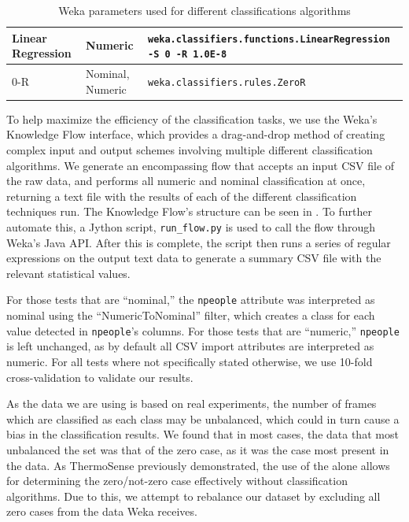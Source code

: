 \documentclass[../thesis/thesis.tex]{subfiles}
\begin{document}
\begin{table}[h]
\begin{tabular}{|p{40mm}|p{20mm}|p{70mm}|}
Linear Regression & Numeric & \texttt{weka.classifiers.functions\newline.LinearRegression \newline -S 0 -R 1.0E-8} \\ \hline

0-R & Nominal, \newline Numeric & \texttt{weka.classifiers.rules.ZeroR} \\ \hline
\end{tabular}
\caption{Weka parameters used for different classifications algorithms}
\label{tab:methods:params}
\end{table}

To help maximize the efficiency of the classification tasks, we use the Weka's Knowledge Flow interface, which provides a drag-and-drop method of creating complex input and output schemes involving multiple different classification algorithms. We generate an encompassing flow that accepts an input CSV file of the raw data, and performs all numeric and nominal classification at once, returning a text file with the results of each of the different classification techniques run. The Knowledge Flow's structure can be seen in . To further automate this, a Jython script, \texttt{run\_flow.py} is used to call the flow through Weka's Java API. After this is complete, the script then runs a series of regular expressions on the output text data to generate a summary CSV file with the relevant statistical values.

For those tests that are ``nominal,'' the \texttt{npeople} attribute was interpreted as nominal using the ``NumericToNominal'' filter, which creates a class for each value detected in \texttt{npeople}'s columns. For those tests that are ``numeric,'' \texttt{npeople} is left unchanged, as by default all CSV import attributes are interpreted as numeric. For all tests where not specifically stated otherwise, we use 10-fold cross-validation to validate our results.

As the data we are using is based on real experiments, the number of frames which are classified as each class may be unbalanced, which could in turn cause a bias in the classification results. We found that in most cases, the data that most unbalanced the set was that of the zero case, as it was the case most present in the data. As ThermoSense previously demonstrated, the use of the \pir alone allows for determining the zero/not-zero case effectively without classification algorithms. Due to this, we attempt to rebalance our dataset by excluding all zero cases from the data Weka receives.
\end{document}
